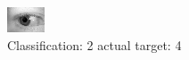 \begin{figure}[h!]
\begin{center}
\includegraphics[width=0.60\columnwidth]{figures/ID779_class_2_target_4.png}
\end{center}
\caption{ Classification: 2 actual target: 4}
\label{fig:ID779_class_2_target_4}
\end{figure}
